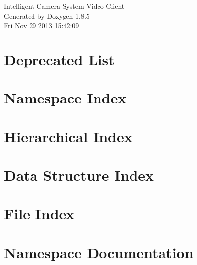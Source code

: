 \documentclass[twoside]{book}
\newcommand{\clearemptydoublepage}{%
  \newpage{\pagestyle{empty}\cleardoublepage}%
}
\begin{document}
\hypersetup{pageanchor=false}
\begin{titlepage}
\vspace*{7cm}
\begin{center}%
{\Large Intelligent Camera System Video Client }\\
\vspace*{1cm}
{\large Generated by Doxygen 1.8.5}\\
\vspace*{0.5cm}
{\small Fri Nov 29 2013 15:42:09}\\
\end{center}
\end{titlepage}
\clearemptydoublepage
\tableofcontents
\clearemptydoublepage
{}
\hypersetup{pageanchor=true}

\chapter{Deprecated List}
\label{deprecated}
\hypertarget{deprecated}{}

\chapter{Namespace Index}

\chapter{Hierarchical Index}

\chapter{Data Structure Index}

\chapter{File Index}

\chapter{Namespace Documentation}



\end{document}
